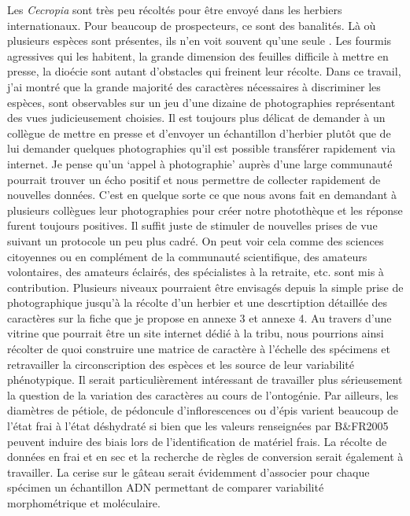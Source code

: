 \documentclass[a4paper]{article}
\theoremstyle{definition}
\theoremstyle{definition}
\theoremstyle{definition}
\theoremstyle{remark}
\begin{document}
Les \emph{Cecropia} sont très peu récoltés pour être envoyé dans les
herbiers internationaux. Pour beaucoup de prospecteurs, ce sont des
banalités. Là où plusieurs espèces sont présentes, ils n'en voit souvent
qu'une seule \citep{Berg2005}. Les fourmis agressives qui les habitent,
la grande dimension des feuilles difficile à mettre en presse, la
dioécie sont autant d'obstacles qui freinent leur récolte. Dans ce
travail, j'ai montré que la grande majorité des caractères nécessaires à
discriminer les espèces, sont observables sur un jeu d'une dizaine de
photographies représentant des vues judicieusement choisies. Il est
toujours plus délicat de demander à un collègue de mettre en presse et
d'envoyer un échantillon d'herbier plutôt que de lui demander quelques
photographies qu'il est possible transférer rapidement via internet. Je
pense qu'un `appel à photographie' auprès d'une large communauté
pourrait trouver un écho positif et nous permettre de collecter
rapidement de nouvelles données. C'est en quelque sorte ce que nous
avons fait en demandant à plusieurs collègues leur photographies pour
créer notre photothèque et les réponse furent toujours positives. Il
suffit juste de stimuler de nouvelles prises de vue suivant un protocole
un peu plus cadré. On peut voir cela comme des sciences citoyennes ou en
complément de la communauté scientifique, des amateurs volontaires, des
amateurs éclairés, des spécialistes à la retraite, etc. sont mis à
contribution. Plusieurs niveaux pourraient être envisagés depuis la
simple prise de photographique jusqu'à la récolte d'un herbier et une
descrtiption détaillée des caractères sur la fiche que je propose en
annexe 3 et annexe 4. Au travers d'une vitrine que pourrait être un site
internet dédié à la tribu, nous pourrions ainsi récolter de quoi
construire une matrice de caractère à l'échelle des spécimens et
retravailler la circonscription des espèces et les source de leur
variabilité phénotypique. Il serait particulièrement intéressant de
travailler plus sérieusement la question de la variation des caractères
au cours de l'ontogénie. Par ailleurs, les diamètres de pétiole, de
pédoncule d'inflorescences ou d'épis varient beaucoup de l'état frai à
l'état déshydraté si bien que les valeurs renseignées par B\&FR2005
peuvent induire des biais lors de l'identification de matériel frais. La
récolte de données en frai et en sec et la recherche de règles de
conversion serait également à travailler. La cerise sur le gâteau serait
évidemment d'associer pour chaque spécimen un échantillon ADN permettant
de comparer variabilité morphométrique et moléculaire. \pagebreak
\end{document}
